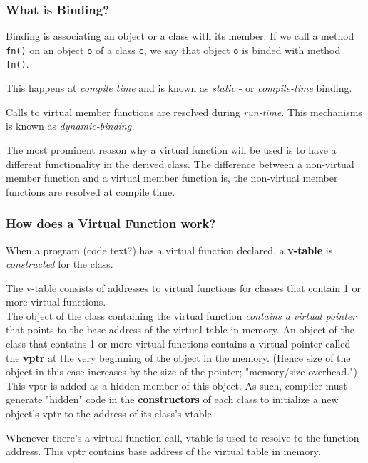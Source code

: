 \documentclass[10pt]{amsart}
\begin{document}
\begin{multicols*}{2}
\subsubsection{What is Binding?}  

Binding is associating an object or a class with its member.   If we call a method \verb|fn()| on an object \verb|o| of a class \verb|c|, we say that object \verb|o| is binded with method \verb|fn()|.  

This happens at \emph{compile time} and is known as \emph{static} - or \emph{compile-time} binding.   

Calls to virtual member functions are resolved during \emph{run-time}.  This mechanisms is known as \emph{dynamic-binding.}   

The most prominent reason why a virtual function will be used is to have a different functionality in the derived class.  The difference between a non-virtual member function and a virtual member function is, the non-virtual member functions are resolved at compile time.  

\subsubsection{How does a Virtual Function work?}  

When a program (code text?) has a virtual function declared, a \textbf{v-table} is \emph{constructed} for the class.  

The v-table consists of addresses to virtual functions for classes that contain 1 or more virtual functions.  \\
The object of the class containing the virtual function \emph{contains a virtual pointer} that points to the base address of the virtual table in memory.  An object of the class that contains 1 or more virtual functions contains a virtual pointer called the \textbf{vptr} at the very beginning of the object in the memory.  (Hence size of the object in this case increases by the size of the pointer; "memory/size overhead.")  \\

This vptr is added as a hidden member of this object.  As such, compiler must generate "hidden" code in the \textbf{constructors} of each class to initialize a new object's vptr to the address of its class's vtable.  

Whenever there's a virtual function call, vtable is used to resolve to the function address.  
This vptr contains base address of the virtual table in memory.  \\


\end{multicols*}
\end{document}

